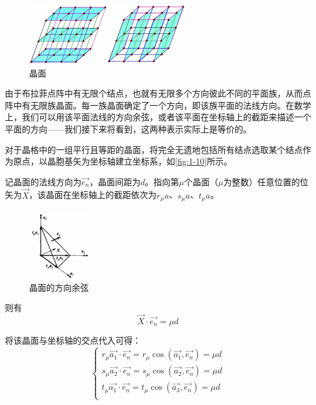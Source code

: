     \begin{figure}[!htbp]
        \centering    
        \includegraphics[height=7em, keepaspectratio=true]{pic/1-33}
        \caption{晶面}
        \label{fig:1-09}
    \end{figure}

    由于布拉菲点阵中有无限个结点，也就有无限多个方向彼此不同的平面族，从而点阵中有无限族晶面。每一族晶面确定了一个方向，即该族平面的法线方向。在数学上，我们可以用该平面法线的方向余弦，或者该平面在坐标轴上的截距来描述一个平面的方向——我们接下来将看到，这两种表示实际上是等价的。

    对于晶格中的一组平行且等距的晶面，将完全无遗地包括所有结点选取某个结点作为原点，以晶胞基矢为坐标轴建立坐标系，如\autoref{fig:1-10}所示。
    
    记晶面的法线方向为$\vec{e_n}$，晶面间距为$d$。指向第$\mu$个晶面（$\mu$为整数）任意位置的位矢为$\vec{X}$，该晶面在坐标轴上的截距依次为$r_\mu a$、$s_\mu a$、$t_\mu a$。

    \begin{figure}[!htbp]
        \centering    
        \includegraphics[height=8em, keepaspectratio=true]{pic/1-34}
        \caption{晶面的方向余弦}
        \label{fig:1-10}
    \end{figure}

    则有
    \[
        \vec{X} \cdot \vec{e_n} = \mu d
    \]
    
    将该晶面与坐标轴的交点代入可得：
    \[
    \begin{cases}
        r_\mu \vec{a_1} \cdot \vec{e_n} = r_\mu \cos (\vec{a_1}, \vec{e_n}) = \mu d \\
        s_\mu \vec{a_2} \cdot \vec{e_n} = s_\mu \cos (\vec{a_2}, \vec{e_n}) = \mu d \\
        t_\mu \vec{a_1} \cdot \vec{e_n} = t_\mu \cos (\vec{a_3}, \vec{e_n}) = \mu d \\
    \end{cases}
    \]

